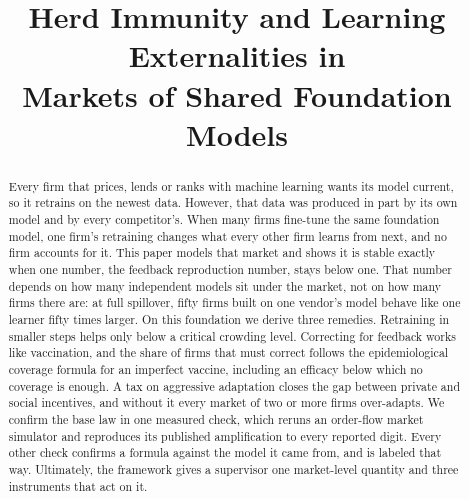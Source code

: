 \documentclass[conference]{IEEEtran}
\theoremstyle{plain}
\begin{document}
\title{Herd Immunity and Learning Externalities in\\ Markets of Shared Foundation Models}

\author{%
\and
{}
}


\maketitle
\IEEEpubidadjcol

\begin{abstract}
Every firm that prices, lends or ranks with machine learning wants its model current, so it retrains on the newest data. However, that data was produced in part by its own model and by every competitor's. When many firms fine-tune the same foundation model, one firm's retraining changes what every other firm learns from next, and no firm accounts for it. This paper models that market and shows it is stable exactly when one number, the feedback reproduction number, stays below one. That number depends on how many independent models sit under the market, not on how many firms there are: at full spillover, fifty firms built on one vendor's model behave like one learner fifty times larger. On this foundation we derive three remedies. Retraining in smaller steps helps only below a critical crowding level. Correcting for feedback works like vaccination, and the share of firms that must correct follows the epidemiological coverage formula for an imperfect vaccine, including an efficacy below which no coverage is enough. A tax on aggressive adaptation closes the gap between private and social incentives, and without it every market of two or more firms over-adapts. We confirm the base law in one measured check, which reruns an order-flow market simulator and reproduces its published amplification to every reported digit. Every other check confirms a formula against the model it came from, and is labeled that way. Ultimately, the framework gives a supervisor one market-level quantity and three instruments that act on it.
\end{abstract}
\end{document}
